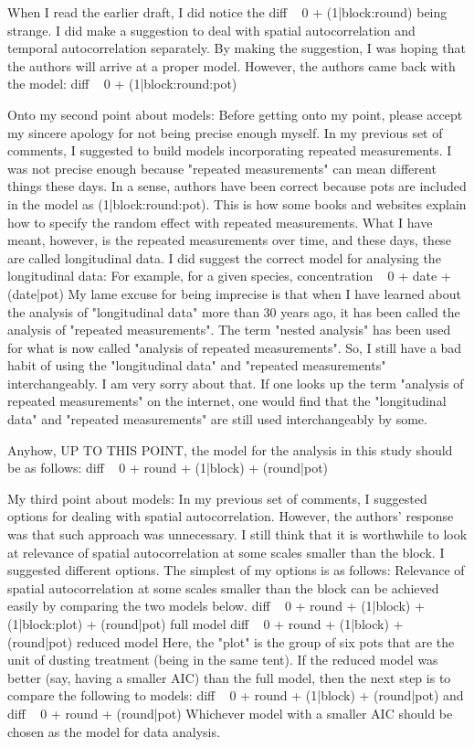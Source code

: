 \documentclass[parskip=half]{scrartcl}
\begin{document}
When I read the earlier draft, I did notice the diff ~ 0 + (1|block:round) being strange.
I did make a suggestion to deal with spatial autocorrelation and temporal autocorrelation separately. 
By making the suggestion, I was hoping that the authors will arrive at a proper model.
However, the authors came back with the model: diff ~ 0 + (1|block:round:pot)

Onto my second point about models:
Before getting onto my point, please accept my sincere apology for not being precise enough myself.
In my previous set of comments, I suggested to build models incorporating repeated measurements.
I was not precise enough because "repeated measurements" can mean different things these days.
In a sense, authors have been correct because pots are included in the model as (1|block:round:pot).
This is how some books and websites explain how to specify the random effect with repeated measurements. 
What I have meant, however, is the repeated measurements over time, and these days, these are called longitudinal data.
I did suggest the correct model for analysing the longitudinal data: For example, for a given species, concentration ~ 0 + date + (date|pot)
My lame excuse for being imprecise is that when I have learned about the analysis of "longitudinal data" more than 30 years ago, it has been called the analysis of "repeated measurements".  The term "nested analysis" has been used for what is now called "analysis of repeated measurements".  So, I still have a bad habit of using the "longitudinal data" and "repeated measurements" interchangeably. I am very sorry about that.
If one looks up the term "analysis of repeated measurements" on the internet, one would find that the "longitudinal data" and "repeated measurements" are still used interchangeably by some.

Anyhow, UP TO THIS POINT, the model for the analysis in this study should be as follows:
diff ~ 0 + round + (1|block) + (round|pot)

My third point about models:
In my previous set of comments, I suggested options for dealing with spatial autocorrelation.  However, the authors' response was that such approach was unnecessary.
I still think that it is worthwhile to look at relevance of spatial autocorrelation at some scales smaller than the block.
I suggested different options.
The simplest of my options is as follows:
Relevance of spatial autocorrelation at some scales smaller than the block can be achieved easily by comparing the two models below.
diff ~ 0 + round + (1|block) + (1|block:plot) + (round|pot)  {full model}
diff ~ 0 + round + (1|block) + (round|pot)  {reduced model}
Here, the "plot" is the group of six pots that are the unit of dusting treatment (being in the same tent).
If the reduced model was better (say, having a smaller AIC) than the full model, then the next step is to compare the following to models:
diff ~ 0 + round + (1|block) + (round|pot)   and
diff ~ 0 + round + (round|pot) 
Whichever model with a smaller AIC should be chosen as the model for data analysis.
\end{document}
